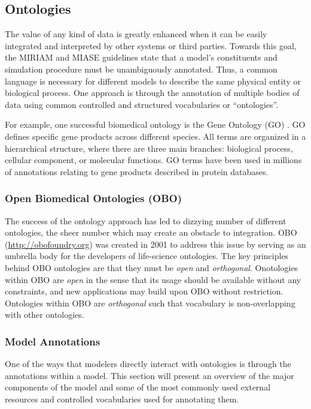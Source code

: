 \subsection{Ontologies}

The value of any kind of data is greatly enhanced when it can be easily
integrated and interpreted by other systems or third parties. Towards
this goal, the MIRIAM and MIASE guidelines state that a model's
constituents and simulation procedure must be unambiguously annotated.
Thus, a common language is necessary for different models to describe
the same physical entity or biological process. One approach is through
the annotation of multiple bodies of data using common controlled and
structured vocabularies or ``ontologies''.

For example, one successful biomedical ontology is the Gene Ontology
(GO) \autocite{smith2005relations}. GO defines specific gene products
across different species. All terms are organized in a hierarchical
structure, where there are three main branches: biological process,
cellular component, or molecular functions. GO terms have been used in
millions of annotations relating to gene products described in protein
databases.

\subsubsection{Open Biomedical Ontologies (OBO)}

The success of the ontology approach has led to dizzying number of
different ontologies, the sheer number which may create an obstacle to
integration. OBO (\url{http://obofoundry.org}) \autocite{smith2007obo}
was created in 2001 to address this issue by serving as an umbrella body
for the developers of life-science ontologies. The key principles behind
OBO ontologies are that they must be \emph{open} and \emph{orthogonal}.
Onotologies within OBO are \emph{open} in the sense that its usage
should be available without any constraints, and new applications may
build upon OBO without restriction. Ontologies within OBO are
\emph{orthogonal} such that vocabulary is non-overlapping with other
ontologies.

\subsubsection{Model Annotations}

One of the ways that modelers directly interact with ontologies is
through the annotations within a model. This section will present an
overview of the major components of the model and some of the most
commonly used external resources and controlled vocabularies used for
annotating them.

